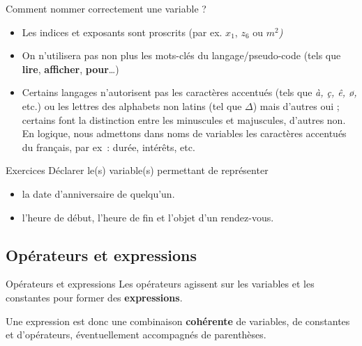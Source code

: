 \begin{frame}{Comment nommer correctement une variable ?}
	\begin{itemize}

	\item
		Les indices et exposants sont proscrits (par ex.
		\textit{$x_1$},
		\textit{$z_6$} ou
		\textit{$m^2$)}
		
	\bigskip
	
	\item
		On n'utilisera pas non plus les 
		mots-clés du langage/pseudo-code (tels que
		\textbf{\textsf{lire}}, 
		\textbf{\textsf{afficher}}, 
		\textbf{\textsf{pour}}…)
		
	\bigskip
	
	\item
		Certains langages n’autorisent pas les caractères accentués (tels que
		\textit{à, ç, ê, ø,} etc.) ou les lettres des alphabets non latins
		(tel que ${\Delta}$) mais d’autres oui ; certains font la distinction
		entre les minuscules et majuscules, d’autres non. En logique, nous
		admettons dans noms de variables les caractères accentués du français,
		par ex~: durée, intérêts, etc.
	\end{itemize}
\end{frame}

\begin{frame}{Exercices}
	Déclarer le(s) variable(s) permettant de représenter 
	\begin{itemize}
		\item la date d'anniversaire de quelqu'un.
		\item l'heure de début, l'heure de fin et	l'objet d'un rendez-vous.
	\end{itemize}
\end{frame}

\subsection{Opérateurs et expressions}

\begin{frame}{Opérateurs et expressions}
	Les opérateurs agissent sur les variables et les constantes pour former
	des \textbf{expressions}. 
	
	\bigskip
	
	Une expression est donc une combinaison
	\textbf{cohérente} de variables, de constantes et d’opérateurs,
	éventuellement accompagnés de parenthèses.
\end{frame}

